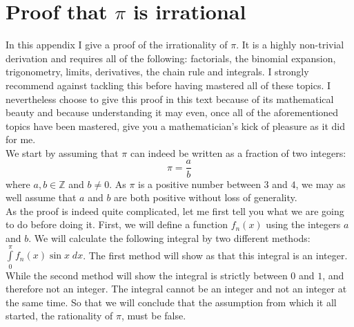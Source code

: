 \chapter{Proof that $\pi$ is irrational}
\label{Irrational_pi}

\noindent In this appendix I give a proof of the irrationality of $\pi$. It is a highly non-trivial derivation and requires all of the following: factorials, the binomial expansion, trigonometry, limits, derivatives, the chain rule and integrals. I strongly recommend against tackling this before having mastered all of these topics. I nevertheless choose to give this proof in this text because of its mathematical beauty and because understanding it may even, once all of the aforementioned topics have been mastered, give you a mathematician's kick of pleasure as it did for me.\\

\noindent We start by assuming that $\pi$ can indeed be written as a fraction of two integers:
$$
\pi = \frac{a}{b}
$$
\noindent where $a,b \in \mathbb{Z}$ and $b \neq 0$. As $\pi$ is a positive number between $3$ and $4$, we may as well assume that $a$ and $b$ are both positive without loss of generality.\\

\noindent As the proof is indeed quite complicated, let me first tell you what we are going to do before doing it. First, we will define a function $f_n(x)$ using the integers $a$ and $b$. We will calculate the following integral by two different methods: $\int\limits_{0}^{\pi} f_n(x) \sin x \; dx$. The first method will show as that this integral is an integer. While the second method will show the integral is strictly between $0$ and $1$, and therefore not an integer. The integral cannot be an integer and not an integer at the same time. So that we will conclude that the assumption from which it all started, the rationality of $\pi$, must be false.\\

